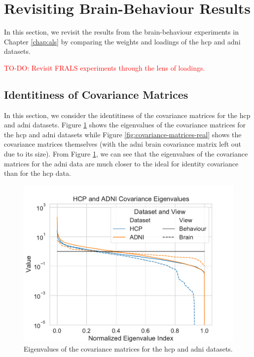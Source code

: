 \section{Revisiting Brain-Behaviour Results}

In this section, we revisit the results from the brain-behaviour experiments in Chapter \ref{chap:als} by comparing the weights and \gls{loadings} of the \acrshort{hcp} and \acrshort{adni} datasets.

\textcolor{red}{TO-DO: Revisit FRALS experiments through the lens of loadings.}

\subsection{Identitiness of Covariance Matrices}
In this section, we consider the identitiness of the covariance matrices for the \acrshort{hcp} and \acrshort{adni} datasets.
Figure \ref{fig:covariance-eigenvalues-real} shows the eigenvalues of the covariance matrices for the \acrshort{hcp} and \acrshort{adni} datasets while Figure \ref{fig:covariance-matrices-real} shows the covariance matrices themselves (with the \acrshort{adni} brain covariance matrix left out due to its size).
From Figure \ref{fig:covariance-eigenvalues-real}, we can see that the eigenvalues of the covariance matrices for the \acrshort{adni} data are much closer to the ideal for identity covariance than for the \acrshort{hcp} data.
\begin{figure}
    \centering
    \includegraphics[width=0.8\linewidth]{figures/covariance/hcp_adni_covariance_eigenvalues}
    \caption{Eigenvalues of the covariance matrices for the \acrshort{hcp} and \acrshort{adni} datasets.}\label{fig:covariance-eigenvalues-real}
\end{figure}

